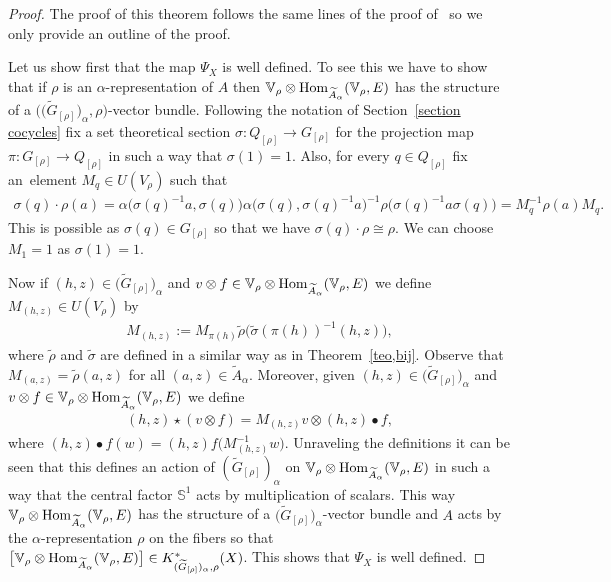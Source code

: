 \documentclass[11pt]{article}
\numberwithin{equation}{section}
\def\S{\mathbb{S}}
\def\V{\mathbb{V}}
\DeclareMathOperator{\Hom}{\textup{Hom}}
\theoremstyle{definition}
\numberwithin{equation}{section}
\begin{document}
\begin{proof}
The proof of this theorem follows the same lines of the proof of~\cite[Theorem 3.1]{GomezUribe}
so we only provide an outline of the proof.

Let us show first that the map $\Psi_{X}$ is well defined. To see this we have to
show that if $\rho$ is an $\alpha$-representation of $A$ then
$\V_{\rho}\otimes\Hom_{\widetilde{A}_{\alpha}}(\V_{\rho},E)$
has the structure of a $\big(\big(\widetilde{G}_{[\rho]}\big)_{\alpha},\rho\big)$-vector bundle.
Following the notation of Section~\ref{section cocycles} fix a set theoretical
section $\sigma\colon Q_{[\rho]}\to G_{[\rho]}$ for the projection map $\pi\colon G_{[\rho]}\to Q_{[\rho]}$
in such a way that $\sigma(1)=1$. Also, for every $q\in Q_{[\rho]}$ fix an~element
$M_{q}\in U(V_{\rho})$ such that
\begin{gather*}
\sigma(q)\cdot \rho(a) =\alpha\big(\sigma(q)^{-1}a,\sigma(q)\big)\alpha\big(\sigma(q),\sigma(q)^{-1}a\big)^{-1}
\rho\big(\sigma(q)^{-1}a\sigma(q)\big)=M_{q}^{-1}\rho(a)M_{q}.
\end{gather*}
This is possible as $\sigma(q)\in G_{[\rho]}$ so that we have $\sigma(q)\cdot \rho\cong \rho$.
We can choose $M_{1}=1$ as $\sigma(1)=1$.

Now if $(h,z)\in \big(\widetilde{G}_{[\rho]}\big)_{\alpha}$ and $v\otimes f\in
\V_{\rho}\otimes \Hom_{\widetilde{A}_{\alpha}}(\V_{\rho},E)$
we define $M_{(h,z)}\in U(V_{\rho})$ by
\begin{gather*}
M_{(h,z)}:=M_{\pi(h)}\tilde{\rho}\big(\tilde{\sigma}(\pi(h))^{-1}(h,z)\big),
\end{gather*}
where $\tilde{\rho}$ and $\tilde{\sigma}$ are defined in a similar way as in
Theorem~\ref{teo,bij}. Observe that $M_{(a,z)}=\tilde{\rho}(a,z)$ for all
$(a,z)\in \widetilde{A}_{\alpha}$. Moreover, given $(h,z)\in \big(\widetilde{G}_{[\rho]}\big)_{\alpha}$
and $v\otimes f\in \V_{\rho}\otimes \Hom_{\widetilde{A}_{\alpha}}(\V_{\rho},E)$
we define
\begin{gather*}
(h,z)\star(v\otimes f)=M_{(h,z)}v\otimes (h,z)\bullet f,
\end{gather*}
where $(h,z)\bullet f (w)=(h,z)f\big(M_{(h,z)}^{-1}w\big)$. Unraveling the definitions it
can be seen that this defines an action of
$(\widetilde{G}_{[\rho]})_{\alpha}$ on $\V_{\rho}\otimes \Hom_{\widetilde{A}_{\alpha}}(\V_{\rho},E)$
in such a way that the central factor $\S^{1}$ acts by multiplication of scalars.
This way $\V_{\rho}\otimes \Hom_{\widetilde{A}_{\alpha}}(\V_{\rho},E)$ has the structure
of a $\big(\widetilde{G}_{[\rho]}\big)_{\alpha}$-vector bundle and $A$ acts by the
$\alpha$-representation $\rho$ on the fibers so that
$\big[\V_{\rho}\otimes \Hom_{\widetilde{A}_{\alpha}}(\V_{\rho},E)\big]\in
K^{\ast}_{(\widetilde{G}_{[\rho]})_{\alpha},\rho}(X)$. This shows that
$\Psi_{X}$ is well defined.



\end{proof}
\end{document}

